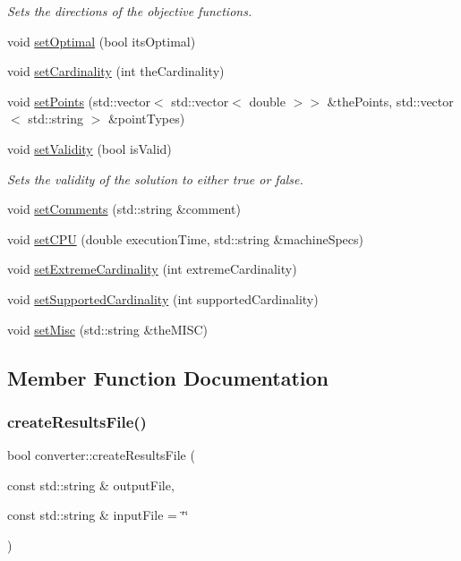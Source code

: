 \begin{DoxyCompactItemize}
\begin{DoxyCompactList}\small\item\em Sets the directions of the objective functions. \end{DoxyCompactList}\item 
void \hyperlink{classconverter_a6d1331eb4b80868ff8d8251cea497a82}{set\+Optimal} (bool its\+Optimal)
\item 
void \hyperlink{classconverter_a8897d824355a5fc576c288689edfb97e}{set\+Cardinality} (int the\+Cardinality)
\item 
void \hyperlink{classconverter_a9d39c373dd13b46914dba0848b152202}{set\+Points} (std\+::vector$<$ std\+::vector$<$ double $>$$>$ \&the\+Points, std\+::vector$<$ std\+::string $>$ \&point\+Types)
\item 
void \hyperlink{classconverter_a84384742ccd6d989c0e3f0fa6e3cbfa0}{set\+Validity} (bool is\+Valid)
\begin{DoxyCompactList}\small\item\em Sets the validity of the solution to either true or false. \end{DoxyCompactList}\item 
void \hyperlink{classconverter_aebeb33eb063aaba00a0bedbbd29d97c6}{set\+Comments} (std\+::string \&comment)
\item 
void \hyperlink{classconverter_a3efdbf4704ecaa181f0c70f4ed80ce38}{set\+C\+PU} (double execution\+Time, std\+::string \&machine\+Specs)
\item 
void \hyperlink{classconverter_aac7ed61410e4f16aed940e845e23cea7}{set\+Extreme\+Cardinality} (int extreme\+Cardinality)
\item 
void \hyperlink{classconverter_a6a9303c575455682facf0e28327f1a4b}{set\+Supported\+Cardinality} (int supported\+Cardinality)
\item 
void \hyperlink{classconverter_ab797244665254fdce6075082358594fd}{set\+Misc} (std\+::string \&the\+M\+I\+SC)
\end{DoxyCompactItemize}


\subsection{Member Function Documentation}
\mbox{\label{classconverter_aa3042d649da8ea07f914b7eea5014703}} 
\subsubsection{\texorpdfstring{create\+Results\+File()}{createResultsFile()}}
{\footnotesize\ttfamily bool converter\+::create\+Results\+File (\begin{DoxyParamCaption}\item[{const std\+::string \&}]{output\+File,  }\item[{const std\+::string \&}]{input\+File = {\ttfamily \char`\"{}\char`\"{}} }\end{DoxyParamCaption})}



